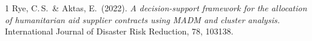 \documentclass[11pt,a4paper]{article}
\begin{document}
\begin{thebibliography}{1}\small
{} Rye, C.\,S.\ \& Aktas, E.\ (2022). \emph{A decision-support
framework for the allocation of humanitarian aid supplier contracts using
MADM and cluster analysis.} International Journal of Disaster Risk Reduction,
78, 103138.
\end{thebibliography}
\end{document}

